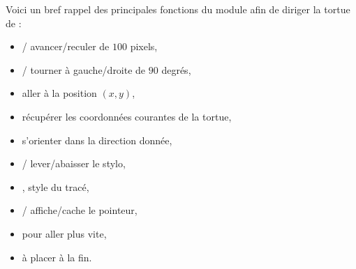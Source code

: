 \documentclass[11pt,class=report,crop=false]{standalone}
\begin{document}
\begin{cours}

Voici un bref rappel des principales fonctions du module  afin de diriger la tortue de \Python :

\begin{itemize}
  \item {}/  avancer/reculer de $100$ pixels, 
  \item {}/ tourner à gauche/droite de $90$ degrés, 
  \item {} aller à la position $(x,y)$,
  \item {} récupérer les coordonnées courantes de la tortue, 
  \item {} s'orienter dans la direction donnée,
  \item {}/ lever/abaisser le stylo,
  \item {},  style du tracé,
  \item {}/ affiche/cache le pointeur,
  \item {} pour aller plus vite,
  \item {} à placer à la fin.
\end{itemize}

\end{cours}

\end{document}
